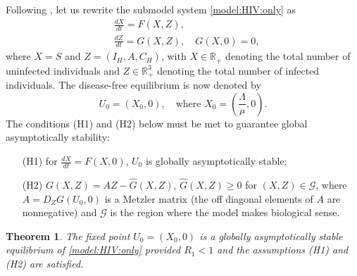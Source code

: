 \documentclass{my_aims}
\newtheorem{theorem}{Theorem}[section]
\theoremstyle{definition}
\begin{document}
Following \cite{CChavez:Feng:Huang:2002}, let us rewrite
the submodel system \eqref{model:HIV:only} as
\begin{equation}
\label{mod:global:stab:DFE:HIV}
\begin{split}
&\frac{dX}{dt} = F(X, Z), \\
&\frac{dZ}{dt} = G(X, Z), \quad G(X, 0) = 0,
\end{split}
\end{equation}
where $X = S$ and $Z = (I_H, A, C_H)$,
with $X \in {\mathbb{R}}_+$ denoting the total number of uninfected individuals
and $Z \in {\mathbb{R}}^3_+$ denoting the total number of infected individuals.
The disease-free equilibrium is now denoted by
\begin{equation*}
U_0 = (X_0, 0), \quad \text{where} \, \, X_0
= \left(\frac{\Lambda}{\mu}, 0  \right).
\end{equation*}
The conditions (H1) and (H2) below must be met
to guarantee global asymptotically stability:
\begin{itemize}
\item[(H1)] for $\frac{dX}{dt} = F(X, 0)$, $U_0$ is globally asymptotically stable;
\item[(H2)] $G(X, Z) = AZ - \hat{G}(X, Z)$, $\hat{G}(X, Z) \geq 0$ for
$(X, Z) \in \mathcal{G}$, where $A = D_Z G(U_0, 0)$ is a Metzler matrix
(the off diagonal elements of $A$ are nonnegative) and $\mathcal{G}$
is the region where the model makes biological sense.
\end{itemize}

\begin{theorem}
The fixed point $U_0 = (X_0, 0)$ is a globally asymptotically stable equilibrium
of \eqref{model:HIV:only} provided $R_1 < 1$
and the assumptions (H1) and (H2) are satisfied.
\end{theorem}
\end{document}
